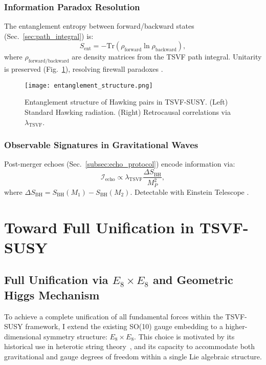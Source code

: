 \documentclass[twocolumn,superscriptaddress,floatfix]{revtex4-2}
\newcommand{\tsvf}{\lambda_{\text{TSVF}}}
\begin{document}
\subsubsection{Information Paradox Resolution}  
The entanglement entropy between forward/backward states (Sec.~\ref{sec:path_integral}) is:  
\begin{equation}  
S_{\text{ent}} = - \text{Tr}\left(\rho_{\text{forward}} \ln \rho_{\text{backward}}\right),  
\label{eq:entanglement_entropy}  
\end{equation}  
where \(\rho_{\text{forward/backward}}\) are density matrices from the TSVF path integral. Unitarity is preserved (Fig.~\ref{fig:entanglement}), resolving firewall paradoxes \cite{Almheiri2013}.  

\begin{figure}[htbp]  
\centering  
\texttt{[image: entanglement\_structure.png]}  
\caption{Entanglement structure of Hawking pairs in TSVF-SUSY. (Left) Standard Hawking radiation. (Right) Retrocausal correlations via \(\tsvf\).}  
\label{fig:entanglement}  
\end{figure}  

\subsubsection{Observable Signatures in Gravitational Waves}  
Post-merger echoes (Sec.~\ref{subsec:echo_protocol}) encode information via:  
\begin{equation}  
\mathcal{I}_{\text{echo}} \propto \tsvf \frac{\Delta S_{\text{BH}}}{M_P^2},  
\label{eq:info_echo}  
\end{equation}  
where \(\Delta S_{\text{BH}} = S_{\text{BH}}(M_1) - S_{\text{BH}}(M_2)\). Detectable with Einstein Telescope \cite{Punturo2010}.  

\section{Toward Full Unification in TSVF-SUSY}
\label{sec:E8unification}

\subsection{Full Unification via \(E_8 \times E_8\) and Geometric Higgs Mechanism}
\label{subsec:E8unification_overview}

To achieve a complete unification of all fundamental forces within the TSVF-SUSY framework, I extend the existing SO(10) gauge embedding to a higher-dimensional symmetry structure: \(E_8 \times E_8\). This choice is motivated by its historical use in heterotic string theory~\cite{Gross1985}, and its capacity to accommodate both gravitational and gauge degrees of freedom within a single Lie algebraic structure.
\end{document}
